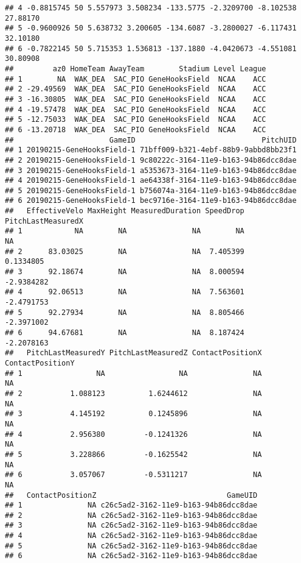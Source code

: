\documentclass[]{article}
\begin{document}
\begin{verbatim}
## 4 -0.8815745 50 5.557973 3.508234 -133.5775 -2.3209700 -8.102538 27.88170
## 5 -0.9600926 50 5.638732 3.200605 -134.6087 -3.2800027 -6.117431 32.10180
## 6 -0.7822145 50 5.715353 1.536813 -137.1880 -4.0420673 -4.551081 30.80908
##         az0 HomeTeam AwayTeam        Stadium Level League
## 1        NA  WAK_DEA  SAC_PIO GeneHooksField  NCAA    ACC
## 2 -29.49569  WAK_DEA  SAC_PIO GeneHooksField  NCAA    ACC
## 3 -16.30805  WAK_DEA  SAC_PIO GeneHooksField  NCAA    ACC
## 4 -19.57478  WAK_DEA  SAC_PIO GeneHooksField  NCAA    ACC
## 5 -12.75033  WAK_DEA  SAC_PIO GeneHooksField  NCAA    ACC
## 6 -13.20718  WAK_DEA  SAC_PIO GeneHooksField  NCAA    ACC
##                      GameID                             PitchUID
## 1 20190215-GeneHooksField-1 71bff009-b321-4ebf-88b9-9abbd8bb23f1
## 2 20190215-GeneHooksField-1 9c80222c-3164-11e9-b163-94b86dcc8dae
## 3 20190215-GeneHooksField-1 a5353673-3164-11e9-b163-94b86dcc8dae
## 4 20190215-GeneHooksField-1 ae64338f-3164-11e9-b163-94b86dcc8dae
## 5 20190215-GeneHooksField-1 b756074a-3164-11e9-b163-94b86dcc8dae
## 6 20190215-GeneHooksField-1 bec9716e-3164-11e9-b163-94b86dcc8dae
##   EffectiveVelo MaxHeight MeasuredDuration SpeedDrop PitchLastMeasuredX
## 1            NA        NA               NA        NA                 NA
## 2      83.03025        NA               NA  7.405399          0.1334805
## 3      92.18674        NA               NA  8.000594         -2.9384282
## 4      92.06513        NA               NA  7.563601         -2.4791753
## 5      92.27934        NA               NA  8.805466         -2.3971002
## 6      94.67681        NA               NA  8.187424         -2.2078163
##   PitchLastMeasuredY PitchLastMeasuredZ ContactPositionX ContactPositionY
## 1                 NA                 NA               NA               NA
## 2           1.088123          1.6244612               NA               NA
## 3           4.145192          0.1245896               NA               NA
## 4           2.956380         -0.1241326               NA               NA
## 5           3.228866         -0.1625542               NA               NA
## 6           3.057067         -0.5311217               NA               NA
##   ContactPositionZ                              GameUID
## 1               NA c26c5ad2-3162-11e9-b163-94b86dcc8dae
## 2               NA c26c5ad2-3162-11e9-b163-94b86dcc8dae
## 3               NA c26c5ad2-3162-11e9-b163-94b86dcc8dae
## 4               NA c26c5ad2-3162-11e9-b163-94b86dcc8dae
## 5               NA c26c5ad2-3162-11e9-b163-94b86dcc8dae
## 6               NA c26c5ad2-3162-11e9-b163-94b86dcc8dae

\end{verbatim}
\end{document}
